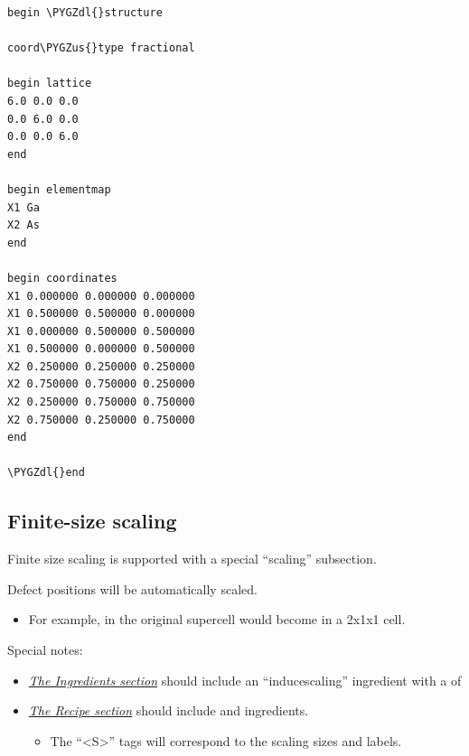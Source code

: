 \documentclass[letterpaper,10pt,english]{sphinxmanual}
\def\PYGZus{\char`\_}
\def\PYGZdl{\char`\$}
\begin{document}
\begin{Verbatim}[commandchars=\\\{\}]
begin \PYGZdl{}structure

coord\PYGZus{}type fractional

begin lattice
6.0 0.0 0.0
0.0 6.0 0.0
0.0 0.0 6.0
end

begin elementmap
X1 Ga
X2 As
end

begin coordinates
X1 0.000000 0.000000 0.000000
X1 0.500000 0.500000 0.000000
X1 0.000000 0.500000 0.500000
X1 0.500000 0.000000 0.500000
X2 0.250000 0.250000 0.250000
X2 0.750000 0.750000 0.250000
X2 0.250000 0.750000 0.750000
X2 0.750000 0.250000 0.750000
end

\PYGZdl{}end
\end{Verbatim}


\subsection{Finite-size scaling}
\label{3_1_1_structure:finite-size-scaling}
Finite size scaling is supported with a special ``scaling'' subsection.

Defect positions will be automatically scaled.
\begin{itemize}
\item {} 
For example,  in the original supercell would become  in a 2x1x1 cell.

\end{itemize}

Special notes:
\begin{itemize}
\item {} 
{\hyperref[3_1_2_ingredients::doc]{\emph{The Ingredients section}}} should include an ``inducescaling'' ingredient with a  of 

\item {} 
{\hyperref[3_1_3_recipe::doc]{\emph{The Recipe section}}} should include  and  ingredients.
\begin{itemize}
\item {} 
The ``\textless{}S\textgreater{}'' tags will correspond to the scaling sizes and labels.

\end{itemize}

\end{itemize}
\end{document}
